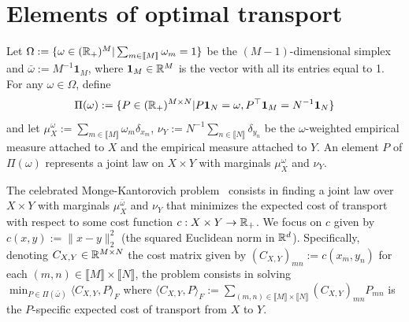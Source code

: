 \section{Elements of optimal transport}
\label{sec:elements}

Let
$\Omega :=  \{\omega \in  (\mathbb{R}_{+})^{M} | \sum_{m\in  \llbracket M\rrbracket}
\omega_{m}    =    1\}$    be     the    $(M-1)$-dimensional    simplex    and
$\bar{\omega} :=  M^{-1} \mathbf{1}_{M}$, where $\mathbf{1}_{M}  \in \mathbb{R}^{M}$
is the vector with  all its entries equal to 1.  For  any $\omega \in \Omega$,
define
\begin{equation*}
  \Pi(\omega) := \{P \in (\mathbb{R}_+)^{M\times N} | P \mathbf1_N =
  \omega, P^\top \mathbf1_M = N^{-1}\mathbf{1}_{N}\}
\end{equation*}
and                                                                        let
$\mu_X^{\omega} := \sum_{m\in\llbracket M\rrbracket} \omega_{m} \delta_{x_m}$,
$\nu_Y  := N^{-1}  \sum_{n\in \llbracket  N \rrbracket}  \delta_{y_n}$ be  the
$\omega$-weighted empirical measure attached to  $X$ and the empirical measure
attached to  $Y$. An element  $P$ of $\Pi(\omega)$  represents a joint  law on
$X \times Y$ with marginals $\mu_X^{\omega}$ and $\nu_Y$.

The celebrated  Monge-Kantorovich problem~\cite[Chapter~2]{COT19}  consists in
finding a joint law over $X  \times Y$ with marginals $\mu_X^{\bar\omega}$ and
$\nu_Y$ that  minimizes the expected  cost of  transport with respect  to some
cost function $c :  X \times Y \rightarrow \mathbb{R}_+$.  We focus  on $c$ given by
$c(x,y)  :=  \|x-y\|_{2}^{2}$  (the  squared Euclidean  norm  in  $\mathbb{R}^{d}$).
Specifically, denoting $C_{X,Y}  \in \mathbb{R}^{M \times N}$ the  cost matrix given
by       $(C_{X,Y})_{mn}        :=       c(x_{m},y_{n})$        for       each
$(m,n) \in \llbracket M\rrbracket  \times \llbracket N\rrbracket$, the problem
consists in solving
$\min_{P \in \Pi(\bar\omega)} \langle C_{X,Y}, P \rangle_F$
where
$\langle C_{X,Y}, P \rangle_F := \sum_{(m,n) \in \llbracket M\rrbracket \times
  \llbracket N\rrbracket} (C_{X,Y})_{mn} P_{mn}$  is the $P$-specific expected
cost of transport from $X$ to $Y$.

